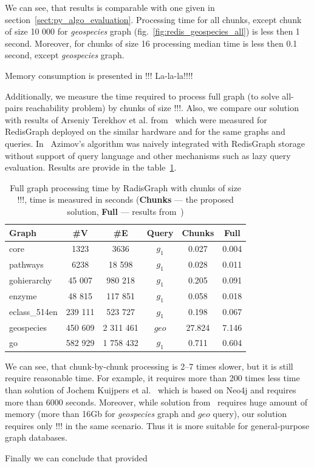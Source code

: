 We can see, that results is comparable with one given in section~\ref{sect:py_algo_evaluation}. 
Processing time for all chunks, except chunk of size 10 000 for \textit{geospecies} graph (fig.~\ref{fig:redis_geospecies_all}) is less then 1 second.
Moreover, for chunks of size 16 processing median time is less then 0.1 second, except \textit{geospecies} graph.

Memory consumption is presented in !!!
La-la-la!!!!

Additionally, we measure the time required to process full graph (to solve all-pairs reachability problem) by chunks of size  !!!.
Also, we compare our solution with results of Arseniy Terekhov et al. from~\cite{10.1145/3398682.3399163} which were measured for RedisGraph deployed on the similar hardware and for the same graphs and queries. In~\cite{10.1145/3398682.3399163} Azimov's algorithm was naively integrated with RedisGraph storage without support of query language and other mechanisms such as lazy query evaluation.
Results are provide in the table~\ref{tbl:redis_full_graph_processing}.

\begin{table}
{
\caption{Full graph processing time by RadisGraph with chunks of size !!!, time is measured in seconds (\textbf{Chunks} --- the proposed solution, \textbf{Full} --- results from~\cite{10.1145/3398682.3399163})}
\label{tbl:redis_full_graph_processing}
\small
{}
\begin{tabular}{|l|c|c|c|c|c|}
\hline
Graph                       & \#V       & \#E      & Query  & Chunks  &  Full  \\
\hline
\hline
core                        & 1323     & 3636       & $g_1$  & 0.027  &  0.004 \\ 
pathways                    & 6238     & 18 598     & $g_1$  & 0.028  &  0.011 \\ 
gohierarchy                 & 45 007   & 980 218    & $g_1$  & 0.205  &  0.091 \\ 
enzyme                      & 48 815   & 117 851    & $g_1$  & 0.058  &  0.018 \\ 
eclass\_514en               & 239 111  & 523 727    & $g_1$  & 0.198  &  0.067 \\ 
geospecies                  & 450 609  & 2 311 461  & $geo$  & 27.824 &  7.146 \\
go                          & 582 929  & 1 758 432  & $g_1$  & 0.711  &  0.604 \\ 
\hline
\end{tabular}
}
\end{table}

We can see, that chunk-by-chunk processing is 2--7 times slower, but it is still require reasonable time.
For example, it requires more than 200 times less time than solution of Jochem Kuijpers et al.~\cite{Kuijpers:2019:ESC:3335783.3335791} which is based on Neo4j and requires more than 6000 seconds.
Moreover, while solution from~\cite{10.1145/3398682.3399163} requires huge amount of memory (more than 16Gb for \textit{geospecies} graph and $geo$ query), our solution requires only !!! in the same scenario.
Thus it is more suitable for general-purpose graph databases.

Finally we can conclude that provided 
